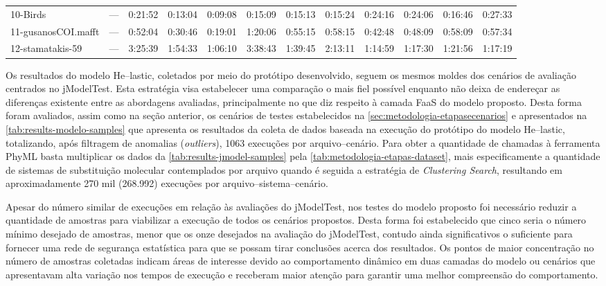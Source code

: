 \documentclass[english,brazilian]{UNISINOSmonografia} %
\begin{document}
{\begin{landscape}
\begin{table}[tbp]
\begin{minipage}{\linewidth}
\begin{tabularx}{\textwidth}{@{\extracolsep{\fill}}lWWWWWWWWWWW@{}}
		10-Birds & --- & 0:21:52 & 0:13:04 & 0:09:08 & 0:15:09 & 0:15:13 & 0:15:24 & 0:24:16 & 0:24:06 & 0:16:46 & 0:27:33 \\
		11-gusanosCOI.mafft & --- & 0:52:04 & 0:30:46 & 0:19:01 & 1:20:06 & 0:55:15 & 0:58:15 & 0:42:48 & 0:48:09 & 0:58:09 & 0:57:34 \\
		12-stamatakis-59 & --- & 3:25:39 & 1:54:33 & 1:06:10 & 3:38:43 & 1:39:45 & 2:13:11 & 1:14:59 & 1:17:30 & 1:21:56 & 1:17:19 \\ 
		\bottomrule
	\end{tabularx}
\end{minipage}
\end{table}
\end{landscape}
}


Os resultados do modelo \textsf{He}--lastic, coletados por meio do protótipo desenvolvido, seguem os mesmos moldes dos cenários de avaliação centrados no jModelTest.
%
Esta estratégia visa estabelecer uma comparação o mais fiel possível enquanto não deixa de endereçar as diferenças existente entre as abordagens avaliadas, principalmente no que diz respeito à camada FaaS do modelo proposto.
%
Desta forma foram avaliados, assim como na seção anterior, os cenários de testes estabelecidos na \autoref{sec:metodologia-etapasecenarios}
e apresentados na \autoref{tab:results-modelo-samples} que apresenta os resultados da coleta de dados baseada na execução do protótipo do modelo \textsf{He}--lastic, totalizando, após filtragem de anomalias (\textit{outliers}), 1063 execuções por arquivo--cenário.
%
Para obter a quantidade de chamadas à ferramenta PhyML basta multiplicar os dados da \autoref{tab:results-jmodel-samples} pela \autoref{tab:metodologia-etapas-dataset}, mais especificamente a quantidade de sistemas de substituição molecular contemplados por arquivo quando é seguida a estratégia de \textit{Clustering Search}, resultando em aproximadamente 270 mil (268.992) execuções por arquivo--sistema--cenário.


Apesar do número similar de execuções em relação às avaliações do jModelTest, nos testes do modelo proposto foi necessário reduzir a quantidade de amostras para viabilizar a execução de todos os cenários propostos.
%
Desta forma foi estabelecido que cinco seria o número mínimo desejado de amostras, menor que os onze desejados na avaliação do jModelTest, contudo ainda significativos o suficiente para fornecer uma rede de segurança estatística para que se possam tirar conclusões acerca dos resultados.
%
Os pontos de maior concentração no número de amostras coletadas indicam áreas de interesse devido ao comportamento dinâmico em duas camadas do modelo ou cenários que apresentavam alta variação nos tempos de execução e receberam maior atenção para garantir uma melhor compreensão do comportamento.
\end{document}
